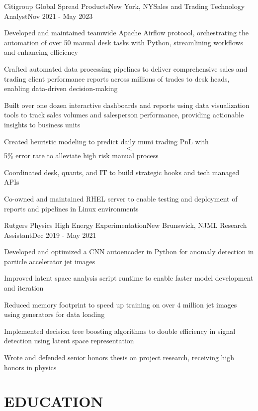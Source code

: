 \documentclass[pdftitle={Michael Tran Resume},pdfauthor={Michael Tran}]{resume}
\begin{document}
\begin{experience}{Citigroup Global Spread Products}{New York, NY}{Sales and Trading Technology Analyst}{Nov 2021 - May 2023}
    \item Developed and maintained teamwide Apache Airflow protocol, orchestrating the automation of over 50 manual desk tasks with Python, streamlining workflows and enhancing efficiency
    \item Crafted automated data processing pipelines to deliver comprehensive sales and trading client performance reports across millions of trades to desk heads, enabling data-driven decision-making
    \item Built over one dozen interactive dashboards and reports using data visualization tools to track sales volumes and salesperson performance, providing actionable insights to business units
    \item Created heuristic modeling to predict daily muni trading PnL with $$<$$ 5\% error rate to alleviate high risk manual process
    \item Coordinated desk, quants, and IT to build strategic hooks and tech managed APIs
    \item Co-owned and maintained RHEL server to enable testing and deployment of reports and pipelines in Linux environments
\end{experience}

\begin{experience}{Rutgers Physics High Energy Experimentation}{New Brunswick, NJ}{ML Research Assistant}{Dec 2019 - May 2021}
    \item Developed and optimized a CNN autoencoder in Python for anomaly detection in particle accelerator jet images
    \item Improved latent space analysis script runtime to enable faster model development and iteration
    \item Reduced memory footprint to speed up training on over 4 million jet images using generators for data loading
    \item Implemented decision tree boosting algorithms to double efficiency in signal detection using latent space representation
    \item Wrote and defended senior honors thesis on project research, receiving high honors in physics
\end{experience}

\separator

\section{EDUCATION}
\end{document}
